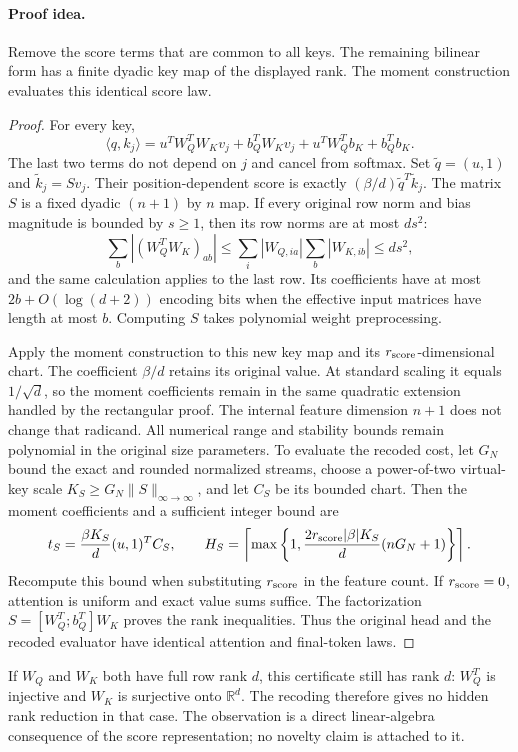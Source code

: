 \paragraph{Proof idea.}
Remove the score terms that are common to all keys. The remaining
bilinear form has a finite dyadic key map of the displayed rank.
The moment construction evaluates this identical score law.

\begin{proof}
For every key,
\[
 \langle q,k_j\rangle
 =u^TW_Q^TW_Kv_j+b_Q^TW_Kv_j
    +u^TW_Q^Tb_K+b_Q^Tb_K.
\]
The last two terms do not depend on $j$ and cancel from softmax.
Set $\widetilde q=(u,1)$ and $\widetilde k_j=Sv_j$.
Their position-dependent score is exactly
$(\beta/d)\widetilde q^T\widetilde k_j$.
The matrix $S$ is a fixed dyadic $(n+1)$ by $n$ map.
If every original row norm and bias magnitude is bounded by
$s\ge1$, then its row norms are at most $ds^2$:
\[
 \sum_b|(W_Q^TW_K)_{ab}|
 \le\sum_i|W_{Q,ia}|\sum_b|W_{K,ib}|
 \le ds^2,
\]
and the same calculation applies to the last row.
Its coefficients have at most $2b+O(\log(d+2))$ encoding bits
when the effective input matrices have length at most $b$.
Computing $S$ takes polynomial weight preprocessing.

Apply the moment construction to this new key map and its
$r_{\rm score}$-dimensional chart. The coefficient $\beta/d$
retains its original value. At standard scaling it equals
$1/\sqrt d$, so the moment coefficients remain in the same
quadratic extension handled by the rectangular proof. The
internal feature dimension $n+1$ does not change that radicand.
All numerical range and stability bounds remain polynomial in
the original size parameters. To evaluate the recoded cost, let
$G_N$ bound the exact and rounded normalized streams, choose a
power-of-two virtual-key scale $K_S\ge G_N\|S\|_{\infty\to\infty}$,
and let $C_S$ be its bounded chart. Then the moment coefficients
and a sufficient integer bound are
\[
 t_S=\frac{\beta K_S}{d}(u,1)^TC_S,\qquad
 H_S=\left\lceil\max\left\{1,
 \frac{2r_{\rm score}|\beta|K_S}{d}(nG_N+1)\right\}\right\rceil.
\]
Recompute this bound when substituting $r_{\rm score}$ in the
feature count. If $r_{\rm score}=0$, attention
is uniform and exact value sums suffice.
The factorization
$S=[W_Q^T;b_Q^T]W_K$ proves the rank inequalities.
Thus the original head and the recoded evaluator have identical
attention and final-token laws.
\end{proof}

If $W_Q$ and $W_K$ both have full row rank $d$, this certificate
still has rank $d$: $W_Q^T$ is injective and $W_K$ is surjective
onto $\mathbb R^d$. The recoding therefore gives no hidden rank
reduction in that case. The observation is a direct linear-algebra
consequence of the score representation; no novelty claim is
attached to it.

